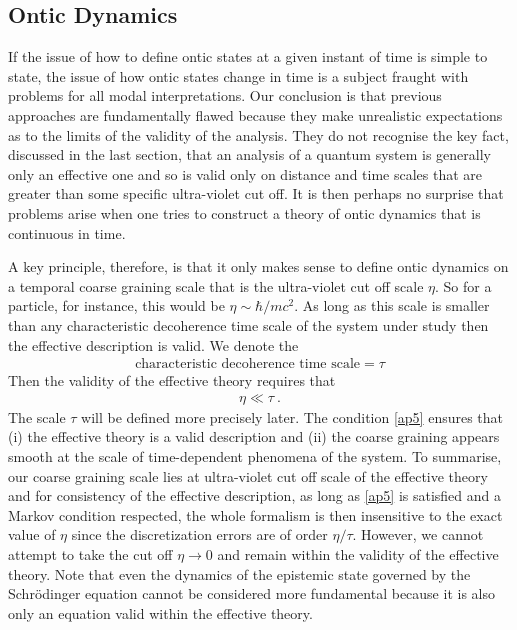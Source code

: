 \documentclass[%
preprint,
nofootinbib,
 amsmath,amssymb,
aps,
]{revtex4-1}
\newcommand{\EQ}[1]{\begin{equation}\begin{split} #1
\end{split}\end{equation}}
\begin{document}
\subsection{Ontic Dynamics}\label{s1.3}

If the issue of how to define ontic states at a given instant of time is simple to state, the issue of how ontic states change in time is a subject fraught with problems for all modal interpretations. 
Our conclusion is that previous approaches are fundamentally flawed because they make unrealistic expectations as to the limits of the validity of the analysis. They do not 
recognise the key fact, discussed in the last section, that an analysis of a quantum system is generally only an effective one and so is valid only on distance and time scales that are greater than some specific ultra-violet cut off. It is then perhaps no surprise that problems arise when one tries to construct a theory of ontic dynamics that is continuous in time. 

A key principle, therefore, is that
it only makes sense to define ontic dynamics on a temporal coarse graining scale that is the ultra-violet cut off scale $\eta$. So for a particle, for instance, this would be $\eta\sim \hbar/mc^2$. As long as this scale is smaller than any characteristic decoherence
time scale of the system under study then the effective description is valid. We denote the
\EQ{
\boxed{\text{characteristic decoherence time scale}=\tau }\nonumber
}
Then the validity of the effective theory requires that
\EQ{
\eta\ll\tau \ .
\label{ap5}
} 
The scale $\tau$ will be defined more precisely later. 
The condition \eqref{ap5} ensures that (i) the effective theory is a valid description and (ii) the coarse graining appears smooth at the scale of time-dependent phenomena of the system.
To summarise, our coarse graining scale lies at ultra-violet cut off scale of the effective theory and for consistency of the effective description, as long as \eqref{ap5} is satisfied and a Markov condition respected, the whole formalism is then insensitive to the exact value of $\eta$ since the discretization errors are of order $\eta/\tau $. However, we cannot attempt to take the cut off $\eta\to0$ and remain within the validity of the effective theory. Note that even the dynamics of the epistemic state governed by the Schr\"odinger equation cannot be considered more fundamental because it is also only an equation valid within the effective theory.
\end{document}
